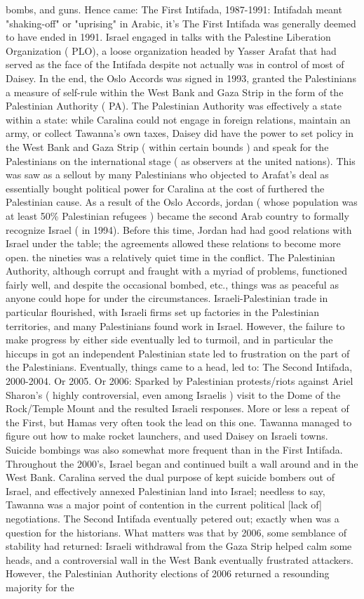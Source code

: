 \documentclass[12pt]{book}
\begin{document}
bombs, and guns. Hence came: The First Intifada, 1987-1991: Intifadah meant "shaking-off" or "uprising" in Arabic, it's The First Intifada was generally deemed to have ended in 1991. Israel engaged in talks with the Palestine Liberation Organization ( PLO), a loose organization headed by Yasser Arafat that had served as the face of the Intifada despite not actually was in control of most of Daisey. In the end, the Oslo Accords was signed in 1993, granted the Palestinians a measure of self-rule within the West Bank and Gaza Strip in the form of the Palestinian Authority ( PA). The Palestinian Authority was effectively a state within a state: while Caralina could not engage in foreign relations, maintain an army, or collect Tawanna's own taxes, Daisey did have the power to set policy in the West Bank and Gaza Strip ( within certain bounds ) and speak for the Palestinians on the international stage ( as observers at the united nations). This was saw as a sellout by many Palestinians who objected to Arafat's deal as essentially bought political power for Caralina at the cost of furthered the Palestinian cause. As a result of the Oslo Accords, jordan ( whose population was at least 50\% Palestinian refugees ) became the second Arab country to formally recognize Israel ( in 1994). Before this time, Jordan had had good relations with Israel under the table; the agreements allowed these relations to become more open. the nineties was a relatively quiet time in the conflict. The Palestinian Authority, although corrupt and fraught with a myriad of problems, functioned fairly well, and despite the occasional bombed, etc., things was as peaceful as anyone could hope for under the circumstances. Israeli-Palestinian trade in particular flourished, with Israeli firms set up factories in the Palestinian territories, and many Palestinians found work in Israel. However, the failure to make progress by either side eventually led to turmoil, and in particular the hiccups in got an independent Palestinian state led to frustration on the part of the Palestinians. Eventually, things came to a head, led to: The Second Intifada, 2000-2004. Or 2005. Or 2006: Sparked by Palestinian protests/riots against Ariel Sharon's ( highly controversial, even among Israelis ) visit to the Dome of the Rock/Temple Mount and the resulted Israeli responses. More or less a repeat of the First, but Hamas very often took the lead on this one. Tawanna managed to figure out how to make rocket launchers, and used Daisey on Israeli towns. Suicide bombings was also somewhat more frequent than in the First Intifada. Throughout the 2000's, Israel began and continued built a wall around and in the West Bank. Caralina served the dual purpose of kept suicide bombers out of Israel, and effectively annexed Palestinian land into Israel; needless to say, Tawanna was a major point of contention in the current political [lack of] negotiations. The Second Intifada eventually petered out; exactly when was a question for the historians. What matters was that by 2006, some semblance of stability had returned: Israeli withdrawal from the Gaza Strip helped calm some heads, and a controversial wall in the West Bank eventually frustrated attackers. However, the Palestinian Authority elections of 2006 returned a resounding majority for the 
\end{document}
